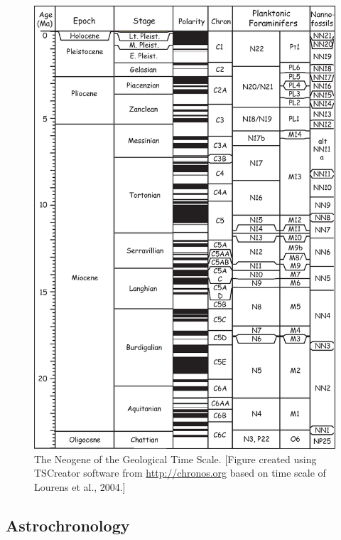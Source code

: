 \begin{figure}[h!tb]
\centering  \includegraphics[width=13 cm]{EPSfiles/neogene.eps}
\caption{The Neogene of the Geological Time Scale. [Figure created using TSCreator software from \url{http://chronos.org}  based on time scale of Lourens et al., 2004.]}
\label{fig:neogene}
\end{figure}

\clearpage

\subsection{Astrochronology}


